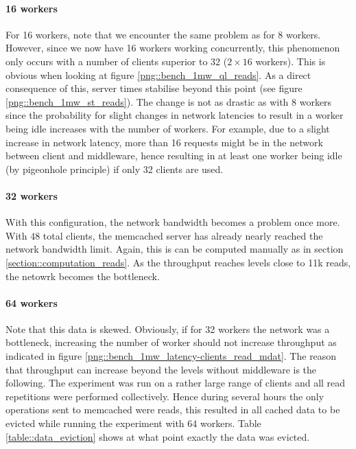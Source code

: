 \documentclass[11pt,a4paper]{article}
\begin{document}
\paragraph{16 workers}
For 16 workers, note that we encounter the same problem as for 8 workers. However, since we now have 16 workers working concurrently, this phenomenon only occurs with a number of clients superior to 32 ($2\times16$ workers). This is obvious when looking at figure \ref{png::bench_1mw_ql_reads}. As a direct consequence of this, server times stabilise beyond this point (see figure \ref{png::bench_1mw_st_reads}). The change is not as drastic as with 8 workers since the probability for slight changes in network latencies to result in a worker being idle increases with the number of workers. For example, due to a slight increase in network latency, more than 16 requests might be in the network between client and middleware, hence resulting in at least one worker being idle (by pigeonhole principle) if only 32 clients are used.

\paragraph{32 workers}
With this configuration, the network bandwidth becomes a problem once more. With 48 total clients, the memcached server has already nearly reached the network bandwidth limit. Again, this is can be computed manually as in section \ref{section::computation_reads}. As the throughput reaches levels close to 11k reads, the netowrk becomes the bottleneck.

\paragraph{64 workers}
Note that this data is skewed. Obviously, if for 32 workers the network was a bottleneck, increasing the number of worker should not increase throughput as indicated in figure \ref{png::bench_1mw_latency-clients_read_mdat}. The reason that throughput can increase beyond the levels without middleware is the following. The experiment was run on a rather large range of clients and all read repetitions were performed collectively. Hence during several hours the only operations sent to memcached were reads, this resulted in all cached data to be evicted while running the experiment with 64 workers. Table \ref{table::data_eviction} shows at what point exactly the data was evicted.
\end{document}
